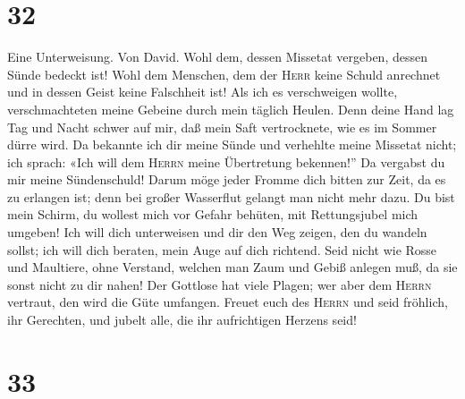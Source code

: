 \hypertarget{section-31}{%
\section{32}\label{section-31}}

 Eine Unterweisung. Von David. Wohl dem, dessen Missetat
vergeben, dessen Sünde bedeckt ist!  Wohl dem Menschen,
dem der \textsc{Herr} keine Schuld anrechnet und in dessen Geist keine
Falschheit ist!  Als ich es verschweigen wollte,
verschmachteten meine Gebeine durch mein täglich Heulen. 
Denn deine Hand lag Tag und Nacht schwer auf mir, daß mein Saft
vertrocknete, wie es im Sommer dürre wird.  Da bekannte
ich dir meine Sünde und verhehlte meine Missetat nicht; ich sprach: «Ich
will dem \textsc{Herrn} meine Übertretung bekennen!'' Da vergabst du mir
meine Sündenschuld!  Darum möge jeder Fromme dich bitten
zur Zeit, da es zu erlangen ist; denn bei großer Wasserflut gelangt man
nicht mehr dazu.  Du bist mein Schirm, du wollest mich vor
Gefahr behüten, mit Rettungsjubel mich umgeben!  Ich will
dich unterweisen und dir den Weg zeigen, den du wandeln sollst; ich will
dich beraten, mein Auge auf dich richtend.  Seid nicht wie
Rosse und Maultiere, ohne Verstand, welchen man Zaum und Gebiß anlegen
muß, da sie sonst nicht zu dir nahen!  Der Gottlose hat
viele Plagen; wer aber dem \textsc{Herrn} vertraut, den wird die Güte
umfangen.  Freuet euch des \textsc{Herrn} und seid
fröhlich, ihr Gerechten, und jubelt alle, die ihr aufrichtigen Herzens
seid!

\hypertarget{section-32}{%
\section{33}\label{section-32}}

